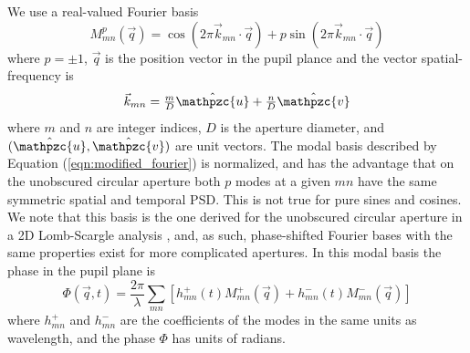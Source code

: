 \documentclass[10pt,preprint]{aastex631}
\begin{document}

We use a real-valued Fourier basis
\begin{equation}
M_{mn}^p(\vec{q}) = \cos(2\pi \vec{k}_{mn} \cdot \vec{q}) + p  \sin(2\pi \vec{k}_{mn} \cdot \vec{q})
\label{eqn:modified_fourier}
\end{equation}
where $p=\pm 1$, $\vec{q}$ is the position vector in the pupil plance and the vector spatial-frequency is 
\begin{equation}
\textstyle\vec{k}_{mn} = \textstyle\frac{m}{D} \hat{\mathpzc{u}} + \textstyle\frac{n}{D} \hat{\mathpzc{v}}
\label{eqn:kq_def}
\end{equation}
where $m$ and $n$ are integer indices, $D$ is the aperture diameter, and $(\hat{\mathpzc{u}},\hat{\mathpzc{v}})$ are unit vectors.  The modal basis described by Equation (\ref{eqn:modified_fourier}) is normalized, and has the advantage that on the unobscured circular aperture both $p$ modes at a given $mn$ have the same symmetric spatial and temporal PSD.  This is not true for pure sines and cosines.  We note that this basis is the one derived for the unobscured circular aperture in a 2D Lomb-Scargle analysis \citep{2020arXiv200110200S}, and, as such, phase-shifted Fourier bases with the same properties exist for more complicated apertures.  In this modal basis the phase in the pupil plane is
\begin{equation}
\Phi(\vec{q},t) = \frac{2\pi}{\lambda} \sum\limits_{mn} \left[ h_{mn}^{+}(t) M_{mn}^{+}(\vec{q}) + h_{mn}^{-}(t) M_{mn}^{-}(\vec{q})\right]
\label{eqn:phi_expansion}
\end{equation}
where $h_{mn}^{+}$ and $h_{mn}^{-}$ are the coefficients of the modes in the same units as wavelength, and the phase $\Phi$ has units of radians.
\end{document}
